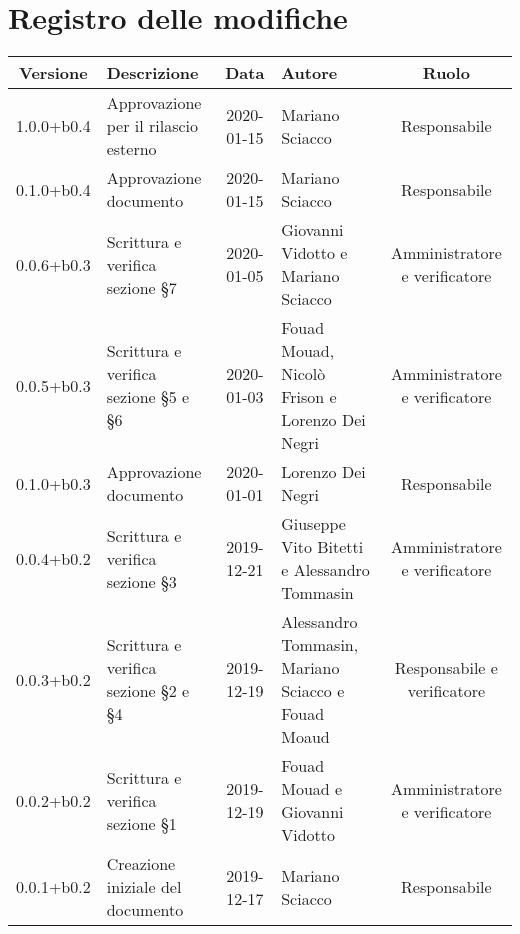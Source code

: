 \section*{Registro delle modifiche}

\begin{center}
	\begin{longtable}{|c|p{3cm}|c|p{4cm}|c|}
	\hline
	\rowcolor{lighter-grayer}
	\textbf{Versione} & \textbf{Descrizione} & \textbf{Data} & \textbf{Autore} & \textbf{Ruolo} \\
	\hline
	\endfirsthead

	1.0.0+b0.4 & Approvazione per il rilascio esterno & 2020-01-15 & Mariano Sciacco & Responsabile \\
	\hline
	0.1.0+b0.4 & Approvazione documento & 2020-01-15 & Mariano Sciacco & Responsabile \\
	\hline 
	0.0.6+b0.3 & Scrittura e verifica sezione \S7  & 2020-01-05 & Giovanni Vidotto e Mariano Sciacco & Amministratore e verificatore \\
	\hline 
	0.0.5+b0.3 & Scrittura e verifica sezione \S5 e \S6  & 2020-01-03 & Fouad Mouad, Nicolò Frison e Lorenzo Dei Negri & Amministratore e verificatore \\
	\hline
	0.1.0+b0.3 & Approvazione documento & 2020-01-01 & Lorenzo Dei Negri & Responsabile \\ 
	\hline
	0.0.4+b0.2 & Scrittura e verifica sezione \S3 & 2019-12-21 & Giuseppe Vito Bitetti e Alessandro Tommasin & Amministratore e verificatore \\
	\hline 
	0.0.3+b0.2 & Scrittura e verifica sezione \S2 e \S4 & 2019-12-19 & Alessandro Tommasin, Mariano Sciacco e Fouad Moaud & Responsabile e verificatore \\
	\hline 
	0.0.2+b0.2 & Scrittura e verifica sezione \S1 & 2019-12-19 & Fouad Mouad e Giovanni Vidotto & Amministratore e verificatore \\
	\hline 
	0.0.1+b0.2 & Creazione iniziale del documento & 2019-12-17 & Mariano Sciacco & Responsabile \\
	\hline
	

	\end{longtable}
\end{center}
